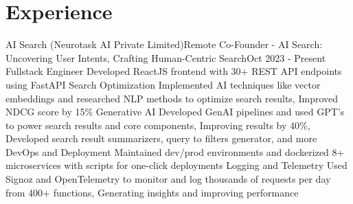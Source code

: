 \section{Experience}
\resumeSubHeadingListStart
\resumeSubheading
{AI Search (Neurotask AI Private Limited)}{Remote}
{Co-Founder - AI Search: Uncovering User Intents, Crafting Human-Centric Search}{Oct 2023 - Present}
\resumeItemListStart
\resumeItem
{Fullstack Engineer}
{Developed ReactJS frontend with 30+ REST API endpoints using FastAPI}
\resumeItem
{Search Optimization}
{Implemented AI techniques like vector embeddings and researched NLP methods to optimize search results, Improved NDCG score by 15\%}
\resumeItem
{Generative AI}
{Developed GenAI pipelines and used GPT's to power search results and core components, Improving results by 40\%, Developed search result summarizers, query to filters generator, and more}
\resumeItem
{DevOps and Deployment}
{Maintained dev/prod environments and dockerized 8+ microservices with scripts for one-click deployments}
\resumeItem
{Logging and Telemetry}
{Used Signoz and OpenTelemetry to monitor and log thousands of requests per day from 400+ functions, Generating insights and improving performance}
\resumeItemListEnd
\resumeSubHeadingListEnd

